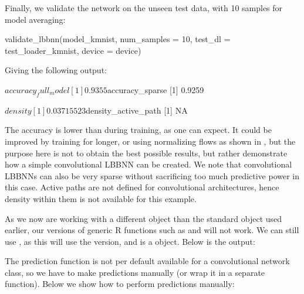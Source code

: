 Finally, we validate the network on the unseen test data, with 10 samples for model averaging:
\begin{example}
validate_lbbnn(model_kmnist, num_samples = 10, test_dl = test_loader_kmnist, device = device)
\end{example}
Giving the following output:
\begin{example}
$accuracy_full_model
[1] 0.9355

$accuracy_sparse
[1] 0.9259

$density
[1] 0.03715523

$density_active_path
[1] NA
\end{example}
The accuracy is lower than during training, as one can expect. It could be improved by training for longer, or using normalizing flows as shown in \cite{skaaret-lund2024sparsifying}, but the purpose here is not to obtain the best possible results, but rather demonstrate how a simple convolutional LBBNN can be created. We note that convolutional LBBNNs can also be very sparse without sacrificing too much predictive power in this case. Active paths are not defined for convolutional architectures, hence density within them is not available for this example.

As we now are working with a different object than the standard  object used earlier, our versions of generic R functions such as  and  will not work. We can still use , as this will use the  version, and  is a  object. Below is the output:

The prediction function is not per default available for a convolutional network class, so we have to make predictions manually (or wrap it in a separate function). Below we show how to perform predictions manually:


